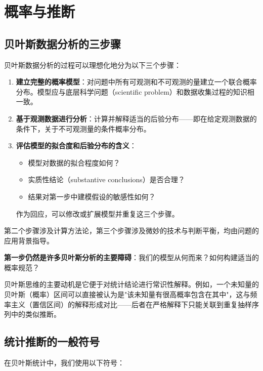 
\chapter{概率与推断}

\section{贝叶斯数据分析的三步骤}

贝叶斯数据分析的过程可以理想化地分为以下三个步骤：

\begin{enumerate}
  \item \textbf{建立完整的概率模型}：对问题中所有可观测和不可观测的量建立一个联合概率分布。模型应与底层科学问题（scientific problem）和数据收集过程的知识相一致。

  \item \textbf{基于观测数据进行分析}：计算并解释适当的后验分布——即在给定观测数据的条件下，关于不可观测量的条件概率分布。

  \item \textbf{评估模型的拟合度和后验分布的含义}：
  \begin{itemize}
    \item 模型对数据的拟合程度如何？
    \item 实质性结论（substantive conclusions）是否合理？
    \item 结果对第一步中建模假设的敏感性如何？
  \end{itemize}
  作为回应，可以修改或扩展模型并重复这三个步骤。
\end{enumerate}

第二个步骤涉及计算方法论，第三个步骤涉及微妙的技术与判断平衡，均由问题的应用背景指导。

\textbf{第一步仍然是许多贝叶斯分析的主要障碍}：我们的模型从何而来？如何构建适当的概率规范？

贝叶斯思维的主要动机是它便于对统计结论进行常识性解释。例如，一个未知量的贝叶斯（概率）区间可以直接被认为是"该未知量有很高概率包含在其中"，这与频率主义（置信区间）的解释形成对比——后者在严格解释下只能关联到重复抽样序列中的类似推断。

\section{统计推断的一般符号}

在贝叶斯统计中，我们使用以下符号：

